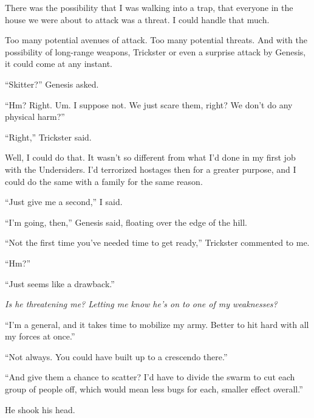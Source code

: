 There was the possibility that I was walking into a trap, that everyone in the house we were about to attack was a threat.  I could handle that much.



Too many potential avenues of attack.  Too many potential threats.  And with the possibility of long-range weapons, Trickster or even a surprise attack by Genesis, it could come at any instant.



``Skitter?''  Genesis asked.



``Hm?  Right.  Um.  I suppose not.  We just scare them, right?  We don't do any physical harm?''



``Right,'' Trickster said.



Well, I could do that.  It wasn't so different from what I'd done in my first job with the Undersiders.  I'd terrorized hostages then for a greater purpose, and I could do the same with a family for the same reason.



``Just give me a second,'' I said.



``I'm going, then,'' Genesis said, floating over the edge of the hill.



``Not the first time you've needed time to get ready,'' Trickster commented to me.



``Hm?''



``Just seems like a drawback.''



\emph{Is he threatening me?  Letting me know he's on to one of my weaknesses?}



``I'm a general, and it takes time to mobilize my army.  Better to hit hard with all my forces at once.''



``Not always.  You could have built up to a crescendo there.''



``And give them a chance to scatter?  I'd have to divide the swarm to cut each group of people off, which would mean less bugs for each, smaller effect overall.''



He shook his head.



